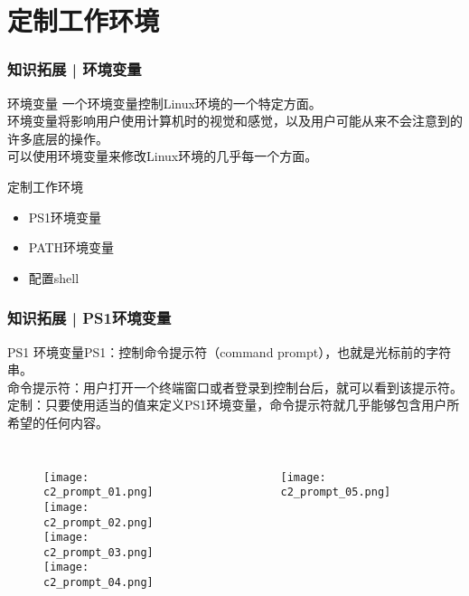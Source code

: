 \section{定制工作环境}
\begin{frame}
  \frametitle{知识拓展 | 环境变量}
  \begin{block}{环境变量}
    一个环境变量控制Linux环境的一个特定方面。\\
    环境变量将影响用户使用计算机时的视觉和感觉，以及用户可能从来不会注意到的许多底层的操作。\\
    可以使用环境变量来修改Linux环境的几乎每一个方面。
  \end{block}
  \pause
  \begin{block}{定制工作环境}
    \begin{itemize}
      \item PS1环境变量
      \item PATH环境变量
      \item 配置shell
    \end{itemize}
  \end{block}
\end{frame}

\begin{frame}
  \frametitle{知识拓展 | PS1环境变量}
  \begin{block}{PS1}
    环境变量PS1：控制命令提示符（command prompt），也就是光标前的字符串。\\
    命令提示符：用户打开一个终端窗口或者登录到控制台后，就可以看到该提示符。\\
    定制：只要使用适当的值来定义PS1环境变量，命令提示符就几乎能够包含用户所希望的任何内容。
  \end{block}
  \vspace{-1em}
  \begin{columns}
  \begin{figure}
    \centering
    \texttt{[image: c2\_prompt\_01.png]}\\
    \vspace{-0.2em}
    \texttt{[image: c2\_prompt\_02.png]}\\
    \vspace{0.2em}
    \texttt{[image: c2\_prompt\_03.png]}\\
    \vspace{0.2em}
    \texttt{[image: c2\_prompt\_04.png]}\\
  \end{figure}
    \begin{figure}
      \centering
    \texttt{[image: c2\_prompt\_05.png]}
    \end{figure}
  \end{columns}
\end{frame}

